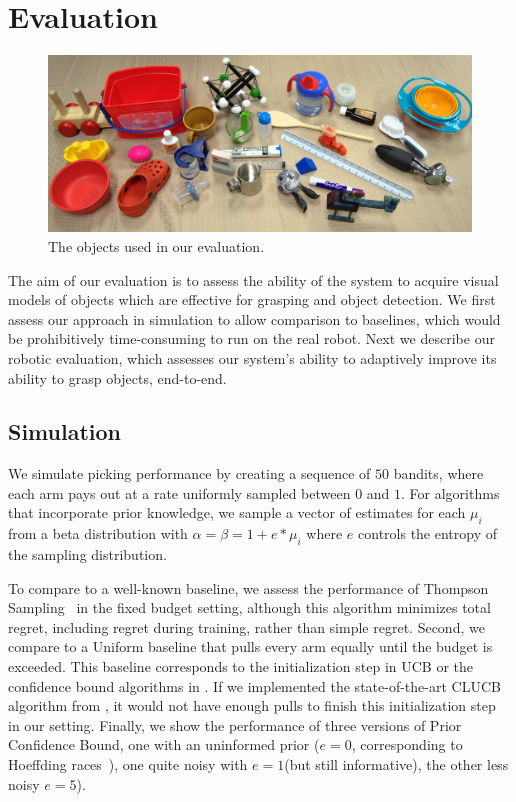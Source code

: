 \documentclass{article}
\newcommand{\algorithmDTxt}{Prior Confidence Bound\xspace}
\begin{document}
\section{Evaluation}
\label{sec:evaluation}

\begin{figure}
\includegraphics[width=1\linewidth]{figures/object_glory_shot.jpg}
\caption{The objects used in our evaluation.\label{fig:object_glory_shot}}
\end{figure}


The aim of our evaluation is to assess the ability of the system to
acquire visual models of objects which are effective for grasping and
object detection.  We first assess our approach in simulation to allow
comparison to baselines, which would be prohibitively time-consuming
to run on the real robot.  Next we describe our robotic evaluation,
which assesses our system's ability to adaptively improve its ability
to grasp objects, end-to-end.

\subsection{Simulation}

We simulate picking performance by creating a sequence of $50$
bandits, where each arm pays out at a rate uniformly sampled between
$0$ and $1$.  For algorithms that incorporate prior knowledge, we
sample a vector of estimates for each $\mu_i$ from a beta distribution
with $\alpha = \beta = 1 + e * \mu_i$ where $e$ controls the entropy
of the sampling distribution.


To compare to a well-known baseline, we assess the performance of
Thompson Sampling~\citep{thompson33} in the fixed budget setting,
although this algorithm minimizes total regret, including regret
during training, rather than simple regret.  Second, we compare to a
Uniform baseline that pulls every arm equally until the budget is
exceeded.  This baseline corresponds to the initialization step in UCB
or the confidence bound algorithms in \citet{chen14}.  If we
implemented the state-of-the-art CLUCB algorithm from \citet{chen14},
it would not have enough pulls to finish this initialization step in
our setting.  Finally, we show the performance of three versions of
\algorithmDTxt, one with an uninformed prior ($e=0$, corresponding to
Hoeffding races~\citep{maron93}), one quite noisy with $e=1$(but still
informative), the other less noisy $e=5$).
\end{document}
